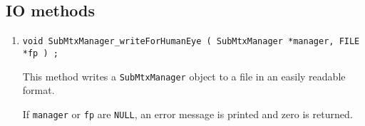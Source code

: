 \subsection{IO methods}
\label{subsection:SubMtxManager:proto:IO}
\par
\begin{enumerate}
\item
\begin{verbatim}
void SubMtxManager_writeForHumanEye ( SubMtxManager *manager, FILE *fp ) ;
\end{verbatim}
\par
This method writes a {\tt SubMtxManager} object to a file in an easily
readable format.
\par {}
If {\tt manager} or {\tt fp} are {\tt NULL},
an error message is printed and zero is returned.
\end{enumerate}
\par
